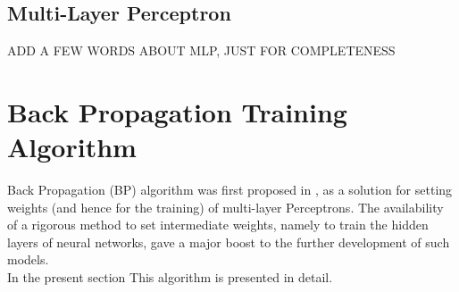 \documentclass[%
    corpo=11pt,
    twoside,
    stile=classica,
    oldstyle,
    autoretitolo,
    tipotesi=magistrale,
    greek,
    evenboxes,
    english
]{toptesi}
\begin{document}
\subsection{Multi-Layer Perceptron}
ADD A FEW WORDS ABOUT MLP, JUST FOR COMPLETENESS
\section{Back Propagation Training Algorithm}
Back Propagation (BP) algorithm was first proposed in \cite{back}, as a solution for setting weights (and hence for the training) of multi-layer Perceptrons. 
The availability of a rigorous method to set intermediate weights, namely to train the hidden layers of neural networks, gave a major boost to the further development of such models. \\
In the present section This algorithm is presented in detail. \\
\end{document}
